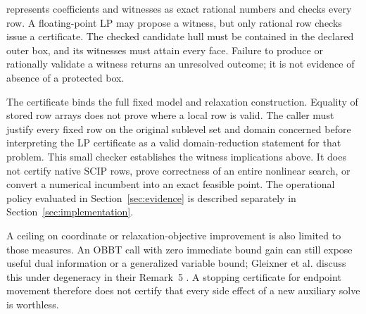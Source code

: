  represents
coefficients and witnesses as exact rational numbers and checks every
row. A floating-point LP may propose a witness, but only rational row
checks issue a certificate. The checked candidate hull must be contained
in the declared outer box, and its witnesses must attain every face.
Failure to produce or rationally validate a witness returns an unresolved
outcome; it is not evidence of absence of a protected box.

The certificate binds the full fixed model and relaxation construction.
Equality of stored row arrays does not prove where a local row is valid.
The caller must justify every fixed row on the original sublevel set
and domain concerned before interpreting the LP certificate as a valid
domain-reduction statement for that problem.
This small checker establishes the witness implications above. It does
not certify native SCIP rows, prove correctness of an entire nonlinear
search, or convert a numerical incumbent into an exact feasible point.
The operational policy evaluated in Section~\ref{sec:evidence} is
described separately in Section~\ref{sec:implementation}.

A ceiling on coordinate or relaxation-objective improvement is also
limited to those measures. An OBBT call with zero immediate bound gain
can still expose useful dual information or a generalized variable bound;
Gleixner et al. discuss this under degeneracy in their Remark~5
\cite{gleixner2017enhancements}. A stopping certificate for endpoint
movement therefore does not certify that every side effect of a new
auxiliary solve is worthless.
